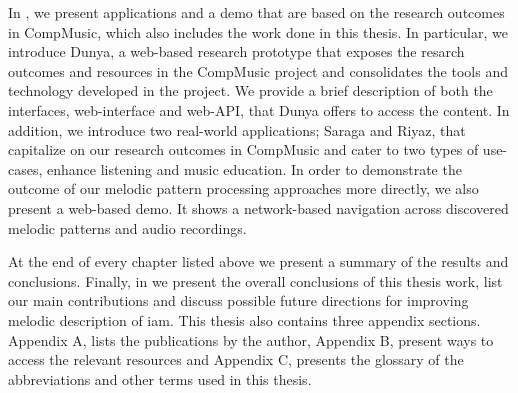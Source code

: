 In , we present applications and a demo that are based on the research outcomes in CompMusic, which also includes the work done in this thesis. In particular, we introduce Dunya, a web-based research prototype that exposes the resarch outcomes and resources in the CompMusic project and consolidates the tools and technology developed in the project. We provide a brief description of both the interfaces, web-interface and web-API, that Dunya offers to access the content. In addition, we introduce two real-world applications; Saraga and Riyaz, that capitalize on our research outcomes in CompMusic and cater to two types of use-cases, enhance listening and music education. In order to demonstrate the outcome of our melodic pattern processing approaches more directly, we also present a web-based demo. It shows a network-based navigation across discovered melodic patterns and audio recordings. 

At the end of every chapter listed above we present a summary of the results and conclusions. Finally, in  we present the overall conclusions of this thesis work, list our main contributions and discuss possible future directions for improving melodic description of \gls{iam}. This thesis also contains three appendix sections. Appendix A, lists the publications by the author, Appendix B, present ways to access the relevant resources and Appendix C, presents the glossary of the abbreviations and other terms used in this thesis.














